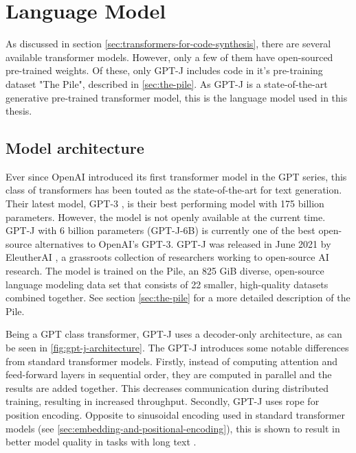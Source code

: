\section{Language Model}
\label{sec:language-model}
As discussed in section \cref{sec:transformers-for-code-synthesis}, there are several available transformer models. However, only a few of them have open-sourced pre-trained weights. Of these, only GPT-J \cite{gpt-j} includes code in it's pre-training dataset "The Pile", described in \cref{sec:the-pile}. As GPT-J is a state-of-the-art generative pre-trained transformer model, this is the language model used in this thesis. 

\subsection{Model architecture}
\label{sec:architecture}
Ever since OpenAI introduced its first transformer model in the GPT series, this class of transformers has been touted as the state-of-the-art for text generation. Their latest model, GPT-3 \cite{brown2020language}, is their best performing model with 175 billion parameters. However, the model is not openly available at the current time. GPT-J \cite{gpt-j} with 6 billion parameters (GPT-J-6B) is currently one of the best open-source alternatives to OpenAI's GPT-3. GPT-J was released in June 2021 by EleutherAI \cite{elutherai}, a grassroots collection of researchers working to open-source AI research. The model is trained on the Pile, an 825 GiB diverse, open-source language modeling data set that consists of 22 smaller, high-quality datasets combined together. See section \cref{sec:the-pile} for a more detailed description of the Pile.

Being a GPT class transformer, GPT-J uses a decoder-only architecture, as can be seen in \cref{fig:gpt-j-architecture}. The GPT-J introduces some notable differences from standard transformer models. Firstly, instead of computing attention and feed-forward layers in sequential order, they are computed in parallel and the results are added together. This decreases communication during distributed training, resulting in increased throughput. Secondly, GPT-J uses \acrfull{rope} \cite{su2021roformer} for position encoding. Opposite to sinusoidal encoding used in standard transformer models (see \cref{sec:embedding-and-positional-encoding}), this is shown to result in better model quality in tasks with long text \cite{su2021roformer}.

